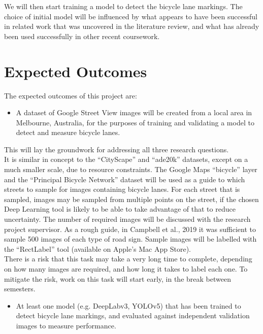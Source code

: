 \documentclass{article}
\begin{document}
We will then start training a model to detect the bicycle lane markings.  The choice of initial model will be influenced by what appears to have been successful in related work that was uncovered in the literature review, and what has already been used successfully in other recent coursework. \\


\section{Expected Outcomes}

The expected outcomes of this project are:
\begin{itemize}
\item{A dataset of Google Street View images will be created from a local area in Melbourne, Australia, for the purposes of training and validating a model to detect and measure bicycle lanes.}
\end{itemize}

This will lay the groundwork for addressing all three research questions.
\\

It is similar in concept to the ``CityScape'' \cite{Cordts_2016_CVPR} and ``ade20k'' \cite{ade20k} datasets, except on a much smaller scale, due to resource constraints.  The Google Maps ``bicycle'' layer and the ``Principal Bicycle Network'' dataset will be used as a guide to which streets to sample for images containing bicycle lanes.  For each street that is sampled, images may be sampled from multiple points on the street, if the chosen Deep Learning tool is likely to be able to take advantage of that to reduce uncertainty.  The number of required images will be discussed with the research project supervisor.  As a rough guide, in Campbell et al., 2019 \cite{CAMPBELL2019101350} it was sufficient to sample 500 images of each type of road sign.  Sample images will be labelled with the ``RectLabel'' tool (available on Apple's Mac App Store).
\\

There is a risk that this task may take a very long time to complete, depending on how many images are required, and how long it takes to label each one.  To mitigate the risk, work on this task will start early, in the break between semesters.

\begin{itemize}
\item{At least one model (e.g. DeepLabv3, YOLOv5) that has been trained to detect bicycle lane markings, and evaluated against independent validation images to measure performance.}
\end{itemize}
\end{document}
